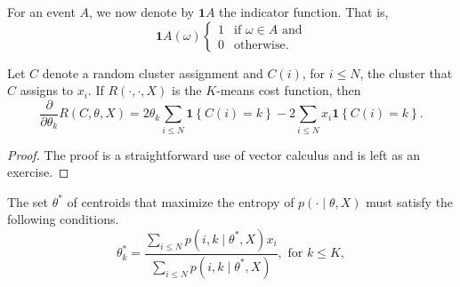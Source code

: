 For an event $A$, we now denote by $\mathbf{1}{A}$ the indicator function. That is,
%
\begin{equation}
\mathbf{1}{A}(\omega)
\begin{cases}
1 & \text{if $\omega \in A$ and}\\
0 & \text{otherwise}.
\end{cases}
\end{equation}
%

\begin{lemma}
Let $C$ denote a random cluster assignment and $C(i)$, for $i \leq N$,
the cluster that $C$ assigns to $x_i$. If $R(\cdot, \cdot, X)$ is the $K$-means cost function, then
%
\begin{equation}
\frac{\partial}{\partial \theta_k} R(C, \theta, X) = 2\theta_k \sum_{i \leq N} \mathbf{1}\left\{C(i) = k\right\} - 2\sum_{i \leq N} x_i \mathbf{1}\left\{C(i) = k\right\}.
\label{eq:deriv_cost_fun_da}
\end{equation}
%
\end{lemma}

\begin{proof}
The proof is a straightforward use of vector calculus and is left as
an exercise.
\end{proof}

\begin{theorem}
The set $\theta^*$ of centroids that maximize the entropy of $p(\cdot \mid \theta, X)$ must satisfy the following conditions.
%
\begin{equation}
\theta^*_k = \frac{\sum_{i \leq N} p\left(i,k \mid \theta^*, X\right)x_i}{\sum_{i \leq N} p\left(i,k \mid \theta^*, X\right)},\text{ for $k \leq K$},
\label{eq:thm_stationarity_conds_centroids_da}
\end{equation}
%
\label{thm:centroid_stationarity_cond}
\end{theorem}

